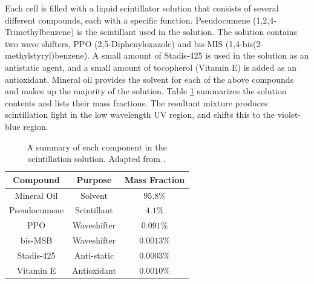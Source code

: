 Each cell is filled with a liquid scintillator solution that consists of several different compounds, each with a specific function. Pseudocumene ({1,2,4-Trimethylbenzene}) is the scintillant used in the solution. The solution contains two wave shifters, PPO (2,5-Diphenyloxazole) and bis-MIS (1,4-bis(2-methylstyryl)benzene). A small amount of Stadis-425 is used in the solution as an antistatic agent, and a small amount of tocopherol (Vitamin E) is added as an antioxidant. Mineral oil provides the solvent for each of the above compounds and makes up the majority of the solution. Table \ref{tab:scintillator} summarizes the solution contents and lists their mass fractions. The resultant mixture produces scintillation light in the low wavelength UV region, and shifts this to the violet-blue region.
\begin{table}[h]
  \begin{center}
    \caption[Scintillator Solution Summary]{A summary of each component in the scintillation solution. Adapted from \cite{ref:TDRNOvA}.}
    \label{tab:scintillator}
    \begin{tabular}{c c c}
      \hline\hline
      Compound & Purpose & Mass Fraction \\
      \hline
      Mineral Oil & Solvent & $95.8\%$ \\
      Pseudocumene & Scintillant & $4.1\%$ \\
      PPO & Waveshifter & $0.091\%$ \\
      bis-MSB & Waveshifter & $0.0013\%$ \\
      Stadis-425 & Anti-static & $0.0003\%$ \\
      Vitamin E & Antioxidant & $0.0010\%$ \\
      \hline
    \end{tabular}
  \end{center}
\end{table}

